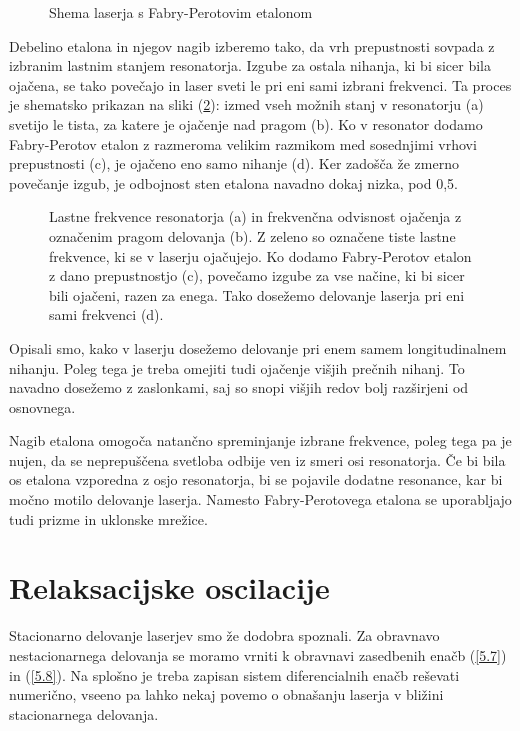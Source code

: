 \begin{figure}[h]
\centering
\def\svgwidth{90truemm} 

\caption{Shema laserja s Fabry-Perotovim etalonom}
\label{fig:FPres}
\end{figure}
Debelino etalona in njegov nagib 
izberemo tako, da vrh prepustnosti sovpada z izbranim lastnim stanjem resonatorja. 
Izgube za ostala nihanja, ki bi sicer bila ojačena, se tako povečajo in laser
sveti le pri eni sami izbrani frekvenci. Ta proces je shematsko prikazan na sliki 
(\ref{fig:FPmodes}): izmed vseh možnih stanj v resonatorju (a) svetijo le tista, za katere
je ojačenje nad pragom (b). Ko v resonator dodamo Fabry-Perotov etalon z razmeroma velikim
razmikom med sosednjimi vrhovi prepustnosti (c), je ojačeno eno samo nihanje (d). 
Ker zadošča že zmerno povečanje izgub, je odbojnost sten etalona navadno dokaj nizka, 
pod 0,5. 

\begin{figure}[h]
\centering
\def\svgwidth{100truemm} 

\caption{Lastne frekvence resonatorja (a) in frekvenčna odvisnost ojačenja z označenim 
pragom delovanja (b). Z zeleno so označene tiste lastne frekvence, ki se v laserju ojačujejo. 
Ko dodamo Fabry-Perotov etalon z dano prepustnostjo (c), povečamo
izgube za vse načine, ki bi sicer bili ojačeni, razen za enega. 
Tako dosežemo delovanje laserja pri eni sami frekvenci (d).}
\label{fig:FPmodes}
\end{figure}
Opisali smo, kako v laserju dosežemo delovanje pri enem samem longitudinalnem nihanju.
Poleg tega je treba omejiti tudi ojačenje višjih prečnih nihanj. To navadno 
dosežemo z zaslonkami, saj so snopi višjih redov bolj razširjeni od osnovnega. 
\begin{remark}
Nagib etalona omogoča natančno spreminjanje izbrane frekvence, poleg tega
pa je nujen, da se neprepuščena svetloba odbije ven iz smeri osi resonatorja. Če bi 
bila os etalona vzporedna z osjo resonatorja, bi se pojavile dodatne resonance, 
kar bi močno motilo delovanje laserja. Namesto Fabry-Perotovega etalona se uporabljajo
tudi prizme in uklonske mrežice.
\end{remark}

\section{Relaksacijske oscilacije}
Stacionarno delovanje laserjev smo že dodobra spoznali. Za obravnavo
nestacionarnega delovanja  se moramo vrniti k obravnavi zasedbenih enačb 
(\ref{5.7}) in (\ref{5.8}). Na splošno je treba zapisan sistem diferencialnih
enačb reševati numerično, vseeno pa lahko nekaj povemo o obnašanju laserja
v bližini stacionarnega delovanja. 

